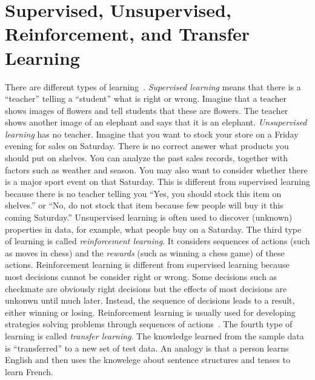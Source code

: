 


\section{Supervised, Unsupervised,  Reinforcement, and Transfer Learning}

There are different types of
learning~\cite{Goodfellow2016DeepLearning}.  {\it Supervised learning}
means that there is a ``teacher'' telling a ``student'' what is right
or wrong. Imagine that a teacher shows images of flowers and tell
students that these are flowers. The teacher shows another image of an
elephant and says that it is an elephant.  {\it Unsupervised learning}
has no teacher. Imagine that you want to stock your store on a Friday
evening for sales on Saturday.  There is no correct answer what
products you should put on shelves.  You can analyze the past sales
records, together with factors such as weather and season.  You may
also want to consider whether there is a major sport event on that
Saturday.  This is different from supervised learning because there is
no teacher telling you ``Yes, you should stock this item on shelves.''
or ``No, do not stock that item because few people will buy it this
coming Saturday.''  Unsupervised learning is often used to discover
(unknown) properties in data, for example, what people buy on a
Saturday.  The third type of learning is called {\it reinforcement
  learning}.  It considers sequences of actions (such as moves in
chess) and the {\it rewards} (such as winning a chess game) of these
actions.  Reinforcement learning is different from supervised learning
because most decisions cannot be consider right or wrong. Some
decisions such as checkmate are obviously right decisions but the
effects of most decisions are unkonwn until much later. Instead, the
sequence of decisions leads to a result, either winning or
losing. Reinforcement learning is usually used for developing
strategies solving problems through sequences of
actions~\cite{Sutton2017ReinforcementLearningIntroduction}.  The
fourth type of learning is called {\it transfer learning}.  The
knowledge learned from the sample data is ``transferred'' to a new set
of test data.  An analogy is that a person learns English and then
uses the knowelege about sentence structures and tenses to learn
French.


